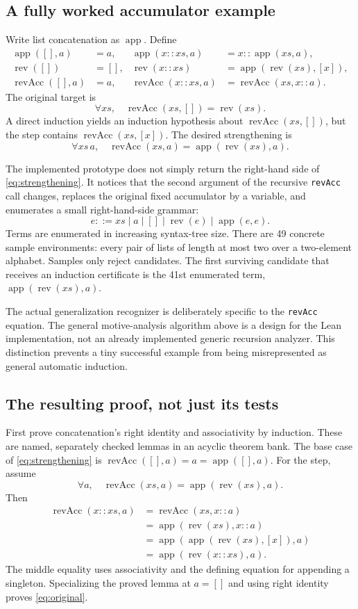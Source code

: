 \documentclass[11pt,a4paper]{article}
\newcommand{\code}[1]{\texttt{#1}}
\newcommand{\app}{\operatorname{app}}
\newcommand{\rev}{\operatorname{rev}}
\newcommand{\racc}{\operatorname{revAcc}}
\begin{document}
\subsection{A fully worked accumulator example}
Write list concatenation as $\app$. Define
\begin{align*}
 \app([],a)&=a,&
 \app(x::xs,a)&=x::\app(xs,a),\\
 \rev([])&=[],&
 \rev(x::xs)&=\app(\rev(xs),[x]),\\
 \racc([],a)&=a,&
 \racc(x::xs,a)&=\racc(xs,x::a).
\end{align*}
The original target is
\begin{equation}\label{eq:original}
 \forall xs,\quad \racc(xs,[])=\rev(xs).
\end{equation}
A direct induction yields an induction hypothesis about
$\racc(xs,[])$, but the step contains $\racc(xs,[x])$. The desired
strengthening is
\begin{equation}\label{eq:strengthening}
 \forall xs\,a,\quad \racc(xs,a)=\app(\rev(xs),a).
\end{equation}

The implemented prototype does not simply return the right-hand side of
\eqref{eq:strengthening}. It notices that the second argument of the recursive
\code{revAcc} call changes, replaces the original fixed accumulator by a
variable, and enumerates a small right-hand-side grammar:
\[
 e ::= xs\mid a\mid []\mid \rev(e)\mid \app(e,e).
\]
Terms are enumerated in increasing syntax-tree size. There are 49 concrete
sample environments: every pair of lists of length at most two over a two-element
alphabet. Samples only reject candidates. The first surviving candidate that
receives an induction certificate is the 41st enumerated term,
$\app(\rev(xs),a)$.

The actual generalization recognizer is deliberately specific to the
\code{revAcc} equation. The general motive-analysis algorithm above is a design
for the Lean implementation, not an already implemented generic recursion
analyzer. This distinction prevents a tiny successful example from being
misrepresented as general automatic induction.

\subsection{The resulting proof, not just its tests}
First prove concatenation's right identity and associativity by induction.
These are named, separately checked lemmas in an acyclic theorem bank. The base
case of \eqref{eq:strengthening} is
$\racc([],a)=a=\app([],a)$.
For the step, assume
\[
 \forall a,\quad\racc(xs,a)=\app(\rev(xs),a).
\]
Then
\begin{align*}
 \racc(x::xs,a)
 &=\racc(xs,x::a)\\
 &=\app(\rev(xs),x::a)\\
 &=\app(\app(\rev(xs),[x]),a)\\
 &=\app(\rev(x::xs),a).
\end{align*}
The middle equality uses associativity and the defining equation for appending
a singleton. Specializing the proved lemma at $a=[]$ and using right identity
proves \eqref{eq:original}.
\end{document}
